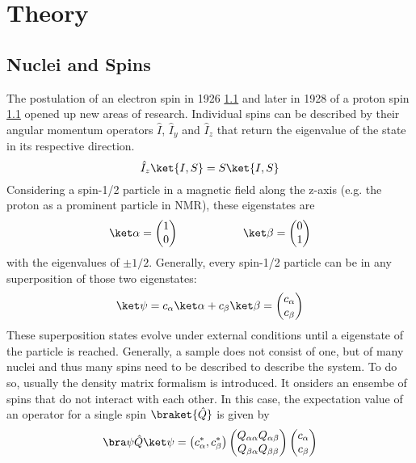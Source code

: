 \chapter{Theory}\label{chap:theory}
	\section{Nuclei and Spins}
	The postulation of an electron spin in 1926 \ref{} and later in 1928 of a proton spin \ref{} opened
	up new areas of research.
	Individual spins can be described by their angular momentum operators $\hat{I}$,
	$\hat{I}_y$ and $\hat{I}_z$ that return the eigenvalue of the state in its respective
	direction.
	\begin{equation}
		\hat I_z \ket{I, S} = S \ket{I,S}
	\end{equation}
	Considering a spin-1/2 particle in a magnetic field along the z-axis (e.g. the proton as a prominent particle in NMR), these
	eigenstates are
	\begin{equation}
	\ket\alpha = \begin{pmatrix}1\\0\end{pmatrix} \hspace{2 cm} \ket\beta =
	\begin{pmatrix}0\\1\end{pmatrix}
	\end{equation}
	with the eigenvalues of $\pm 1/2$.
	Generally, every spin-1/2 particle can be in any superposition of those two eigenstates:
	\begin{equation}
		\ket\psi = c_\alpha \ket\alpha + c_\beta \ket \beta = \begin{pmatrix} c_\alpha \\
		c_\beta\end{pmatrix}
	\end{equation}
	These superposition states evolve under external conditions until a eigenstate of the particle
	is reached.
	Generally, a sample does not consist of one, but of many nuclei and thus many spins need to be
	described to describe the system. To do so, usually the density matrix formalism is introduced.
	It onsiders an ensembe of spins that do not interact with each other. In this case, the
	expectation value of an operator for a single spin $\braket{\hat Q}$ is given by
	\begin{equation}
	\bra\psi\hat Q\ket\psi = \left( c_\alpha^*, c_\beta^*\right)
	\begin{pmatrix}
		Q_{\alpha\alpha} Q_{\alpha\beta}\\
		Q_{\beta\alpha} Q_{\beta\beta}
	\end{pmatrix}
	\begin{pmatrix}
		c_\alpha\\
		c_\beta
	\end{pmatrix}
	\end{equation}
